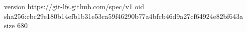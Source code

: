 version https://git-lfs.github.com/spec/v1
oid sha256:cbc29e180b14efb1b31e53ca59f46290b77a4bfcb46d9a27cf64924e82bf643a
size 680
